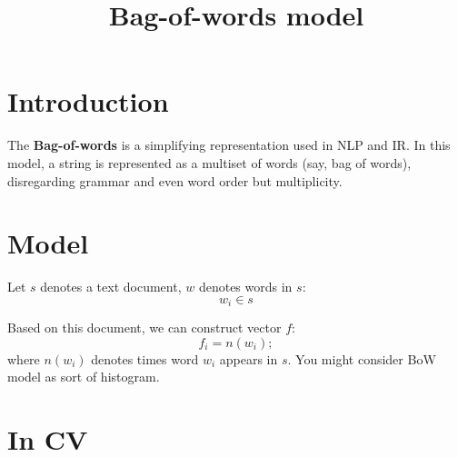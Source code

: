\documentclass{ctexart}
\begin{document}
\setlength{\parindent}{0pt}

\title{Bag-of-words model}
\maketitle

\section{Introduction}
The \textbf{Bag-of-words} is a simplifying representation used in NLP and IR. In this model, a
string is represented as a multiset of words (say, bag of words), disregarding grammar and even
word order but multiplicity.

\section{Model}
Let $s$ denotes a text document, $w$ denotes words in $s$:
\begin{equation}
	w_i \in s
\end{equation}

Based on this document, we can construct vector $f$:
\begin{equation}
	f_i = n(w_i);
\end{equation}
where $n(w_i)$ denotes times word $w_i$ appears in $s$. You might consider BoW model as sort of
histogram.

\section{In CV}
\end{document}
